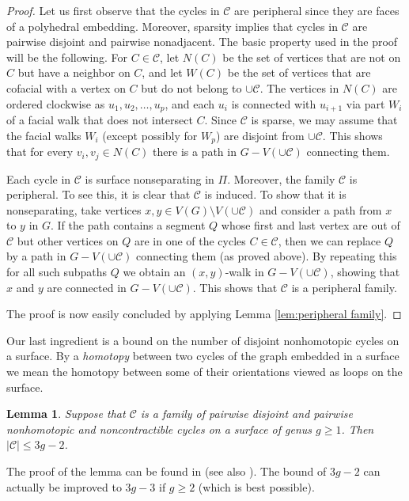 \documentclass[11pt]{article}
\newtheorem{lemma}[theorem]{Lemma}
\newcommand\C{\mathcal C}
\begin{document}
\begin{proof}
  Let us first observe that the cycles in $\C$ are peripheral since they are faces of a polyhedral embedding. Moreover, sparsity implies that cycles in $\C$ are pairwise disjoint and pairwise nonadjacent.
  The basic property used in the proof will be the following. For $C\in \C$, let $N(C)$ be the set of vertices that are not on $C$ but have a neighbor on $C$, and let $W(C)$ be the set of vertices that are cofacial with a vertex on $C$ but do not belong to $\cup\C$. The vertices in $N(C)$ are ordered clockwise as $u_1,u_2,\dots,u_p$, and each $u_i$ is connected with $u_{i+1}$ via part $W_i$ of a facial walk that does not intersect $C$. Since $\C$ is sparse, we may assume that the facial walks $W_i$ (except possibly for $W_p$) are disjoint from $\cup\C$. This shows that for every $v_i,v_j\in N(C)$ there is a path in $G-V(\cup\C)$ connecting them.

  Each cycle in $\C$ is surface nonseparating in $\Pi$. Moreover, the family $\C$ is peripheral. To see this, it is clear that $\C$ is induced. To show that it is nonseparating, take vertices $x,y\in V(G)\setminus V(\cup\C)$ and consider a path from $x$ to $y$ in $G$. If the path contains a segment $Q$ whose first and last vertex are out of $\C$ but other vertices on $Q$ are in one of the cycles $C\in \C$, then we can replace $Q$ by a path in $G-V(\cup\C)$ connecting them (as proved above). By repeating this for all such subpaths $Q$ we obtain an $(x,y)$-walk in $G-V(\cup\C)$, showing that $x$ and $y$ are connected in $G-V(\cup\C)$. This shows that $\C$ is a peripheral family.

  The proof is now easily concluded by applying Lemma \ref{lem:peripheral family}.
\end{proof}

Our last ingredient is a bound on the number of disjoint nonhomotopic cycles on a surface. By a \emph{homotopy} between two cycles of the graph embedded in a surface we mean the homotopy between some of their orientations viewed as loops on the surface.

\begin{lemma}\label{lem:disjoint nonhomotopic}
  Suppose that $\C$ is a family of pairwise disjoint and pairwise nonhomotopic and noncontractible cycles on a surface of genus $g\ge1$. Then $|\C|\le 3g-2$.
\end{lemma}

The proof of the lemma can be found in \cite{MaMo92} (see also \cite[Proposition 4.2.6]{MT01}). The bound of $3g-2$ can actually be improved to $3g-3$ if $g\ge2$ (which is best possible).
\end{document}
